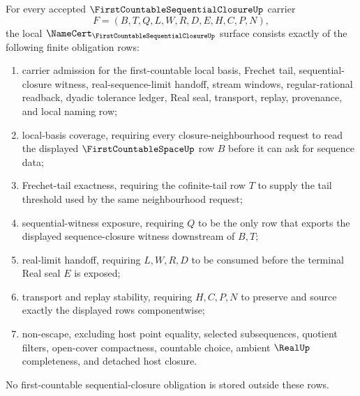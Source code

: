 \begin{theorem}
\label{thm:first-countable-sequential-closure-namecert-obligations}
For every accepted $\FirstCountableSequentialClosureUp$ carrier
$$
F=(B,T,Q,L,W,R,D,E,H,C,P,N),
$$
the local $\NameCert_{\FirstCountableSequentialClosureUp}$ surface consists exactly of the following finite obligation rows:
\begin{enumerate}
\item carrier admission for the first-countable local basis, Frechet tail, sequential-closure witness, real-sequence-limit handoff, stream windows, regular-rational readback, dyadic tolerance ledger, Real seal, transport, replay, provenance, and local naming row;
\item local-basis coverage, requiring every closure-neighbourhood request to read the displayed $\FirstCountableSpaceUp$ row $B$ before it can ask for sequence data;
\item Frechet-tail exactness, requiring the cofinite-tail row $T$ to supply the tail threshold used by the same neighbourhood request;
\item sequential-witness exposure, requiring $Q$ to be the only row that exports the displayed sequence-closure witness downstream of $B,T$;
\item real-limit handoff, requiring $L,W,R,D$ to be consumed before the terminal Real seal $E$ is exposed;
\item transport and replay stability, requiring $H,C,P,N$ to preserve and source exactly the displayed rows componentwise;
\item non-escape, excluding host point equality, selected subsequences, quotient filters, open-cover compactness, countable choice, ambient $\RealUp$ completeness, and detached host closure.
\end{enumerate}
No first-countable sequential-closure obligation is stored outside these rows.
\end{theorem}
